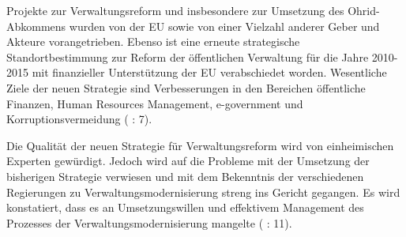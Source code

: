Projekte zur Verwaltungsreform und insbesondere zur Umsetzung des Ohrid-Abkommens wurden von der EU sowie von einer Vielzahl anderer Geber und Akteure vorangetrieben. Ebenso ist eine erneute strategische Standortbestimmung zur Reform der öffentlichen Verwaltung für die Jahre 2010-2015 mit finanzieller Unterstützung der EU verabschiedet worden. Wesentliche Ziele der neuen Strategie sind Verbesserungen in den Bereichen öffentliche Finanzen, Human Resources Management, e-government und Korruptionsvermeidung (\cite{dimeski} : 7). \par
Die Qualität der neuen Strategie für Verwaltungsreform wird von einheimischen Experten gewürdigt. Jedoch wird auf die Probleme mit der Umsetzung der bisherigen Strategie verwiesen und mit dem Bekenntnis der verschiedenen Regierungen zu Verwaltungsmodernisierung streng ins Gericht gegangen. Es wird konstatiert, dass es an Umsetzungswillen und effektivem Management des Prozesses der Verwaltungsmodernisierung mangelte (\cite{dimeski} : 11).

